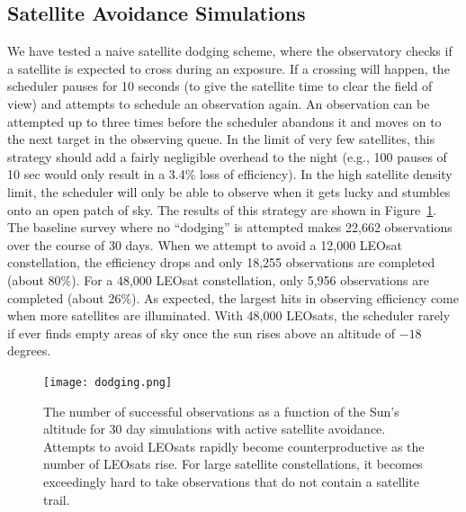 \documentclass[twocolumn,trackchanges]{aastex63}
\begin{document}
\subsection{Satellite Avoidance Simulations} \label{subsec:dodge}
We have tested a naive satellite dodging scheme, where the observatory checks if a satellite is expected to cross during an exposure.
If a crossing will happen, the scheduler pauses for 10 seconds (to give the satellite time to clear the field of view) and attempts to schedule an observation again. An observation can be attempted up to three times before the scheduler abandons it and moves on to the next target in the observing queue. In the limit of very few satellites, this strategy should add a fairly negligible overhead to the night (e.g., 100 pauses of 10 sec would only result in a 3.4\% loss of efficiency). In the high satellite density limit, the scheduler will only be able to observe when it gets lucky and stumbles onto an open patch of sky. The results of this strategy are shown in Figure~\ref{fig:dodging}. The baseline survey where no ``dodging'' is attempted makes 22,662 observations over the course of 30 days.
When we attempt to avoid a 12,000 LEOsat constellation, the efficiency drops and only 18,255 observations are completed (about 80\%). For a 48,000 LEOsat constellation, only 5,956 observations are completed (about 26\%). As expected, the largest hits in observing efficiency come when more satellites are illuminated. With 48,000 LEOsats, the scheduler rarely if ever finds empty areas of sky once the sun rises above an altitude of $-18$ degrees.

\begin{figure}[ht]
\texttt{[image: dodging.png]}
\caption{The number of successful observations as a function of the Sun's altitude for
30 day simulations with active satellite avoidance. Attempts to avoid LEOsats rapidly become counterproductive as the number of LEOsats rise. For large satellite constellations, it becomes exceedingly hard to take observations that do not contain a satellite trail.
\label{fig:dodging}}
\end{figure}
\end{document}
